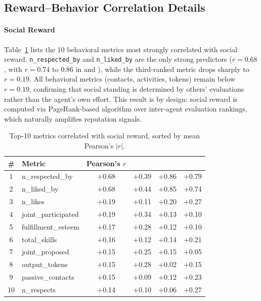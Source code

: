 \subsection{Reward--Behavior Correlation Details}
\label{sec:appendix_reward_correlation}


\paragraph{Social Reward}
Table~\ref{tab:corr_social} lists the 10 behavioral metrics most strongly correlated with social reward.
\texttt{n\_respected\_by} and \texttt{n\_liked\_by} are the only strong predictors
($r = 0.68$, with $r = 0.74$ to $0.86$ in \academy{} and \campus{}),
while the third-ranked metric drops sharply to $r = 0.19$.
All behavioral metrics (contacts, activities, tokens) remain below $r = 0.19$,
confirming that social standing is determined by others' evaluations rather than the agent's own effort.
This result is by design: social reward is computed via PageRank-based algorithm over inter-agent evaluation rankings,
which naturally amplifies reputation signals.

\begin{table}[htbp]
  \centering
  \caption{%
    Top-10 metrics correlated with social reward, sorted by mean Pearson's $|r|$.
  }
  \label{tab:corr_social}
  \small
  \begin{tabular}{clcccc}
    \toprule
    \# & Metric & Pearson's $r$ & \apartment{} & \academy{} & \campus{} \\
    \midrule
    1  & n\_respected\_by         & $+$0.68 & $+$0.39 & $+$0.86 & $+$0.79 \\
    2  & n\_liked\_by             & $+$0.68 & $+$0.44 & $+$0.85 & $+$0.74 \\
    3  & n\_likes                 & $+$0.19 & $+$0.11 & $+$0.20 & $+$0.27 \\
    4  & joint\_participated      & $+$0.19 & $+$0.34 & $+$0.13 & $+$0.10 \\
    5  & fulfillment\_esteem      & $+$0.17 & $+$0.28 & $+$0.12 & $+$0.10 \\
    6  & total\_skills            & $+$0.16 & $+$0.12 & $+$0.14 & $+$0.21 \\
    7  & joint\_proposed          & $+$0.15 & $+$0.25 & $+$0.15 & $+$0.05 \\
    8  & output\_tokens           & $+$0.15 & $+$0.28 & $+$0.02 & $+$0.15 \\
    9  & passive\_contacts        & $+$0.15 & $+$0.09 & $+$0.12 & $+$0.23 \\
    10 & n\_respects              & $+$0.14 & $+$0.10 & $+$0.06 & $+$0.27 \\
    \bottomrule
  \end{tabular}
\end{table}

